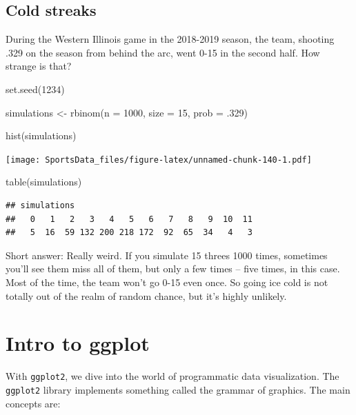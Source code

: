 \documentclass[
]{book}
\newenvironment{Shaded}{\begin{snugshade}}{\end{snugshade}}
\newcommand{\AttributeTok}[1]{\textcolor[rgb]{0.77,0.63,0.00}{#1}}
\newcommand{\DecValTok}[1]{\textcolor[rgb]{0.00,0.00,0.81}{#1}}
\newcommand{\FunctionTok}[1]{\textcolor[rgb]{0.00,0.00,0.00}{#1}}
\newcommand{\NormalTok}[1]{#1}
\newcommand{\OtherTok}[1]{\textcolor[rgb]{0.56,0.35,0.01}{#1}}
\begin{document}
\hypertarget{cold-streaks}{%
\section{Cold streaks}\label{cold-streaks}}

During the Western Illinois game in the 2018-2019 season, the team, shooting .329 on the season from behind the arc, went 0-15 in the second half. How strange is that?

\begin{Shaded}
\begin{Highlighting}[]
\FunctionTok{set.seed}\NormalTok{(}\DecValTok{1234}\NormalTok{)}

\NormalTok{simulations }\OtherTok{\textless{}{-}} \FunctionTok{rbinom}\NormalTok{(}\AttributeTok{n =} \DecValTok{1000}\NormalTok{, }\AttributeTok{size =} \DecValTok{15}\NormalTok{, }\AttributeTok{prob =}\NormalTok{ .}\DecValTok{329}\NormalTok{)}

\FunctionTok{hist}\NormalTok{(simulations)}
\end{Highlighting}
\end{Shaded}

\texttt{[image: SportsData\_files/figure-latex/unnamed-chunk-140-1.pdf]}

\begin{Shaded}
\begin{Highlighting}[]
\FunctionTok{table}\NormalTok{(simulations)}
\end{Highlighting}
\end{Shaded}

\begin{verbatim}
## simulations
##   0   1   2   3   4   5   6   7   8   9  10  11 
##   5  16  59 132 200 218 172  92  65  34   4   3
\end{verbatim}

Short answer: Really weird. If you simulate 15 threes 1000 times, sometimes you'll see them miss all of them, but only a few times -- five times, in this case. Most of the time, the team won't go 0-15 even once. So going ice cold is not totally out of the realm of random chance, but it's highly unlikely.

\hypertarget{intro-to-ggplot}{%
\chapter{Intro to ggplot}\label{intro-to-ggplot}}

With \texttt{ggplot2}, we dive into the world of programmatic data visualization. The \texttt{ggplot2} library implements something called the grammar of graphics. The main concepts are:
\end{document}
